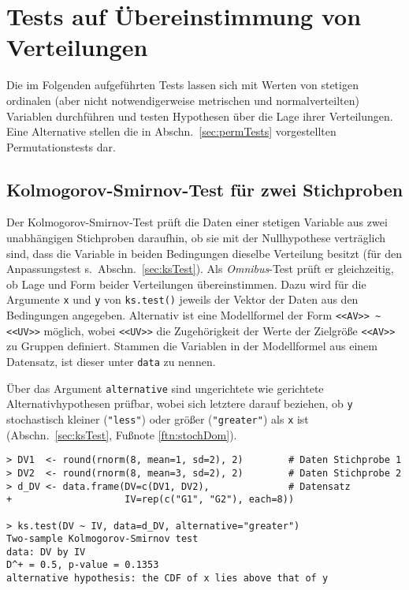 \section{Tests auf Übereinstimmung von Verteilungen}
\label{sec:distrEq}

Die im Folgenden aufgeführten Tests lassen sich mit Werten von stetigen ordinalen (aber nicht notwendigerweise metrischen und normalverteilten) Variablen durchführen und testen Hypothesen über die Lage ihrer Verteilungen. Eine Alternative stellen die in Abschn.\ \ref{sec:permTests} vorgestellten Permutationstests dar.

\subsection{Kolmogorov-Smirnov-Test für zwei Stichproben}
\label{sec:ksoTest}

Der Kolmogorov-Smirnov-Test prüft die Daten einer stetigen Variable aus zwei unabhängigen Stichproben daraufhin, ob sie mit der Nullhypothese verträglich sind, dass die Variable in beiden Bedingungen dieselbe Verteilung besitzt (für den Anpassungstest s.\ Abschn.\ \ref{sec:ksTest}). Als \emph{Omnibus}-Test prüft er gleichzeitig, ob Lage und Form beider Verteilungen übereinstimmen. Dazu wird für die Argumente \lstinline!x! und \lstinline!y! von \lstinline!ks.test()! jeweils der Vektor der Daten aus den Bedingungen angegeben. Alternativ ist eine Modellformel der Form \lstinline!<<AV>> ~ <<UV>>! möglich, wobei \lstinline!<<UV>>! die Zugehörigkeit der Werte der Zielgröße \lstinline!<<AV>>! zu Gruppen definiert. Stammen die Variablen in der Modellformel aus einem Datensatz, ist dieser unter \lstinline!data! zu nennen.

Über das Argument \lstinline!alternative! sind ungerichtete wie gerichtete Alternativhypothesen prüfbar, wobei sich letztere darauf beziehen, ob \lstinline!y! stochastisch kleiner (\lstinline!"less"!) oder größer (\lstinline!"greater"!) als \lstinline!x! ist (Abschn.\ \ref{sec:ksTest}, Fußnote \ref{ftn:stochDom}).
\begin{lstlisting}
> DV1  <- round(rnorm(8, mean=1, sd=2), 2)        # Daten Stichprobe 1
> DV2  <- round(rnorm(8, mean=3, sd=2), 2)        # Daten Stichprobe 2
> d_DV <- data.frame(DV=c(DV1, DV2),              # Datensatz
+                    IV=rep(c("G1", "G2"), each=8))

> ks.test(DV ~ IV, data=d_DV, alternative="greater")
Two-sample Kolmogorov-Smirnov test
data: DV by IV
D^+ = 0.5, p-value = 0.1353
alternative hypothesis: the CDF of x lies above that of y
\end{lstlisting}

